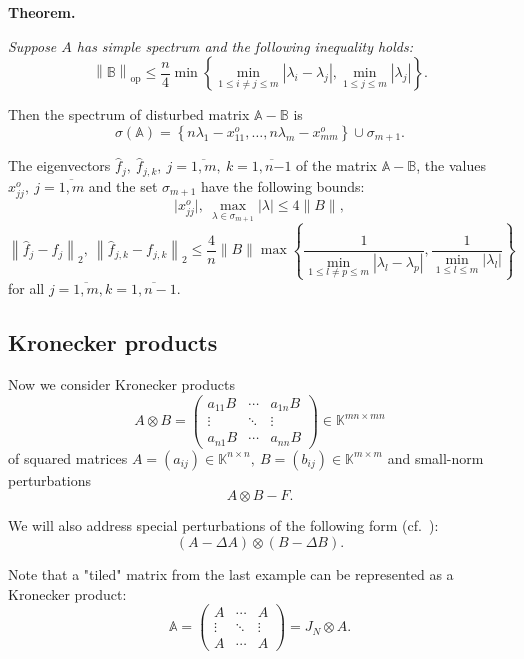 \documentclass[a4paper]{jpconf}
\begin{document}
\textbf{Theorem.}
{\it
Suppose \( A \) has simple spectrum and the following inequality holds:
\[
    \left\| \mathbb{B} \right\|_{\mathrm{op}}
        \leq 
        \frac{n}{4}
         \min\left\{
             \min\limits_{1\leq i{\neq}j \leq m }{|\lambda_i - \lambda_j|},
             \min\limits_{1\leq j \leq m}{|\lambda_j|}
         \right\}.
 \]

Then the spectrum of disturbed matrix \( \mathbb{A} - \mathbb{B} \) is
\[
    \sigma\left(\mathbb{A}\right) =
        \left\{
            n\lambda_1 - x_{11}^o, \ldots, n\lambda_m - x_{mm}^o
        \right\}
    \cup \sigma_{m{+}1}.
\]

The eigenvectors
    \( \hat{f}_j,\ \hat{f}_{j,k},\ j{=}\overline{1,m},\ k{=}\overline{1,n{-1}} \)
    of the matrix \( \mathbb{A}{-}\mathbb{B} \),
    the values \( x_{jj}^o,\ j{=}\overline{1,m} \)
    and the set \( \sigma_{m{+}1} \) have the following bounds:
\[
    \lvert x_{jj}^o\rvert,
    \ \max_{\lambda\in\sigma_{m{+}1}} \lvert\lambda\rvert
    \leq 4\|B\|,
\]
\[
    \left\| \hat{f}_j - f_j \right\|_2,
    \ \left\| \hat{f}_{j,k} - f_{j,k}\right\|_2
    \leq
    \frac4n \|B\|
         \max\left\{
         \frac{1}{
             \min\limits_{1\leq l{\neq}p \leq m }{|\lambda_l - \lambda_p|}},
         \frac{1}{
             \min\limits_{1\leq l \leq m}{|\lambda_l|}}
         \right\}
\]
for all \( j{=}\overline{1,m}, k{=}\overline{1,n-1} \).
\/}

\subsection*{Kronecker products}

Now we consider Kronecker products
\[
    A\otimes B =
    \begin{pmatrix}
        a_{11} B & \cdots & a_{1n} B \\
        \vdots   & \ddots & \vdots \\
        a_{n1} B & \cdots & a_{nn} B
    \end{pmatrix}
    \in \mathbb{K}^{{mn}{\times}{mn}}
\]
of squared matrices
\( A={(a_{ij})}\in\mathbb{K}^{n{\times}n},
 \ B={(b_{ij})}\in\mathbb{K}^{m{\times}m} \)
and small-norm perturbations
\[
    A\otimes B - F.
\]

We will also address special
    perturbations of the following form (cf.~\cite{XIANG2005210}):
\[
    (A-\Delta A)\otimes (B - \Delta B).
\]

Note that a "tiled" matrix from the last example
    can be represented as a Kronecker product:
\[
    \mathbb{A} =
    \begin{pmatrix}
    A & \cdots & A\\
    \vdots & \ddots & \vdots \\
    A & \cdots & A\end{pmatrix} =
        J_N\otimes A.
    \]
\end{document}

